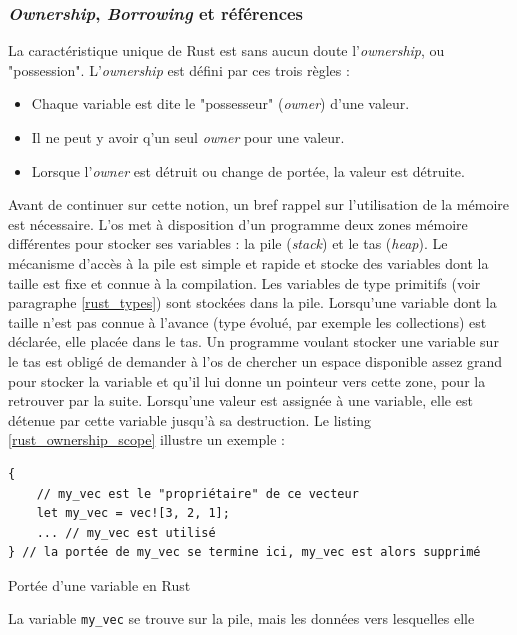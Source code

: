 \documentclass[a4paper, 12pt]{article}
\newenvironment{code}{\captionsetup{type=listing}}{}
\begin{document}
\subsubsection{\textit{Ownership}, \textit{Borrowing} et références}\label{rust_ownership_borrowing}
La caractéristique unique de Rust est sans aucun doute l'\textit{ownership}, ou "possession". 
L'\textit{ownership} est défini par ces trois règles :
\begin{itemize}
    \item Chaque variable est dite le "possesseur" (\textit{owner}) d'une valeur.
    \item Il ne peut y avoir q'un seul \textit{owner} pour une valeur.
    \item Lorsque l'\textit{owner} est détruit ou change de portée, la valeur est détruite.
\end{itemize}
Avant de continuer sur cette notion, un bref rappel sur l'utilisation de la mémoire est nécessaire. 
L'\acrshort{os} met à disposition d'un programme deux zones mémoire différentes pour stocker ses 
variables : la pile (\textit{stack}) et le tas (\textit{heap}). Le mécanisme d'accès à la pile est 
simple et rapide et stocke des variables dont la taille est fixe et connue à la compilation. Les 
variables de type primitifs (voir paragraphe \ref{rust_types}) sont stockées dans la pile. Lorsqu'une 
variable dont la taille n'est pas connue à l'avance (type évolué, par exemple les collections) est 
déclarée, elle placée dans le tas. Un programme voulant stocker une variable sur le tas est obligé 
de demander à l'\acrshort{os} de chercher un espace disponible assez grand pour stocker la variable 
et qu'il lui donne un pointeur vers cette zone, pour la retrouver par la suite.
\bigbreak
Lorsqu'une valeur est assignée à une variable, elle est détenue par cette variable jusqu'à sa 
destruction. Le listing \ref{rust_ownership_scope} illustre un exemple :
\bigbreak
\begin{code}
    \begin{verbatim}
{
    // my_vec est le "propriétaire" de ce vecteur
    let my_vec = vec![3, 2, 1]; 
    ... // my_vec est utilisé
} // la portée de my_vec se termine ici, my_vec est alors supprimé
    \end{verbatim}
    \caption{Portée d'une variable en Rust}
    \label{rust_ownership_scope}
\end{code}
\bigbreak
La variable \texttt{my_vec} se trouve sur la pile, mais les données vers lesquelles elle 
\end{document}

